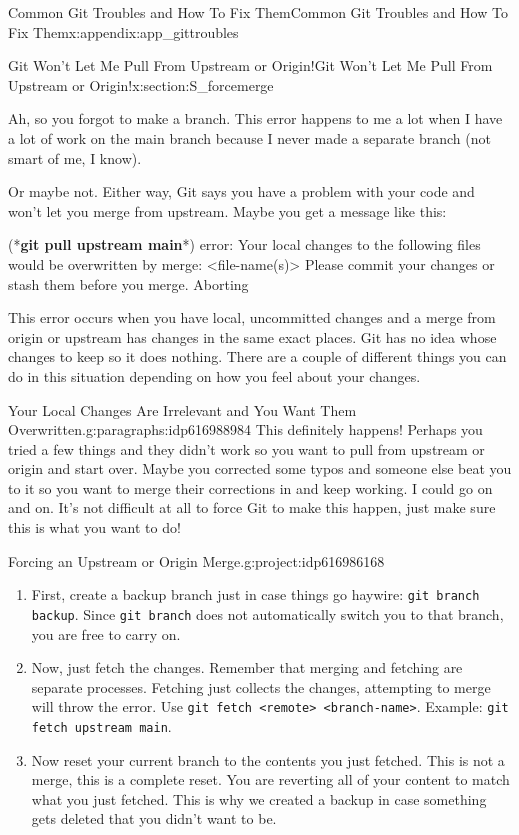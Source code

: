 \documentclass[oneside,10pt,]{book}
\newcommand{\mono}[1]{\texttt{#1}}
\newcommand{\consoleinput}[1]{\textbf{#1}}
\begin{document}
\begin{appendixptx}{Common Git Troubles and How To Fix Them}{}{Common Git Troubles and How To Fix Them}{}{}{x:appendix:app_gittroubles}
\begin{sectionptx}{Git Won't Let Me Pull From Upstream or Origin!}{}{Git Won't Let Me Pull From Upstream or Origin!}{}{}{x:section:S_forcemerge}
%
%
%
%
%
\begin{introduction}{}%
Ah, so you forgot to make a branch. This error happens to me a lot when I have a lot of work on the main branch because I never made a separate branch (not smart of me, I know).%
\par
Or maybe not. Either way, Git says you have a problem with your code and won't let you merge from upstream. Maybe you get a message like this: \begin{console}{0}{1}{0}
(*\consoleinput{git pull upstream main}*)
error: Your local changes to the following files would be overwritten by merge:
        <file-name(s)>
Please commit your changes or stash them before you merge.
Aborting
\end{console}
%
\par
This error occurs when you have local, uncommitted changes and a merge from origin or upstream has changes in the same exact places. Git has no idea whose changes to keep so it does nothing. There are a couple of different things you can do in this situation depending on how you feel about your changes.%
\end{introduction}%
\begin{paragraphs}{Your Local Changes Are Irrelevant and You Want Them Overwritten.}{g:paragraphs:idp616988984}%
This definitely happens! Perhaps you tried a few things and they didn't work so you want to pull from upstream or origin and start over. Maybe you corrected some typos and someone else beat you to it so you want to merge their corrections in and keep working. I could go on and on. It's not difficult at all to force Git to make this happen, just make sure this is what you want to do!%
\begin{project}{Forcing an Upstream or Origin Merge.}{g:project:idp616986168}%
\begin{enumerate}[font=\bfseries,label=(\alph*),ref=\alph*]
\item{}First, create a backup branch just in case things go haywire: \mono{git branch backup}. Since \mono{git branch} does not automatically switch you to that branch, you are free to carry on.%
\item{}Now, just fetch the changes. Remember that merging and fetching are separate processes. Fetching just collects the changes, attempting to merge will throw the error. Use \mono{git fetch <remote> <branch-name>}. Example: \mono{git fetch upstream main}.%
\item{}Now reset your current branch to the contents you just fetched. This is not a merge, this is a complete reset. You are reverting all of your content to match what you just fetched. This is why we created a backup in case something gets deleted that you didn't want to be.%

\end{enumerate}
\end{project}
\end{paragraphs}
\end{sectionptx}
\end{appendixptx}
\end{document}
